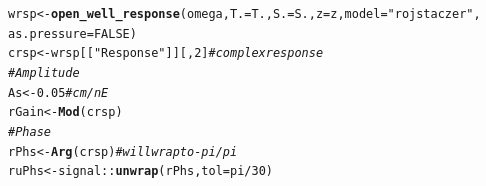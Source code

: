 \documentclass[10pt]{article}\usepackage[]{graphicx}\usepackage[]{color}
\makeatletter
\newcommand{\hlnum}[1]{\textcolor[rgb]{0.686,0.059,0.569}{#1}}%
\newcommand{\hlstr}[1]{\textcolor[rgb]{0.192,0.494,0.8}{#1}}%
\newcommand{\hlcom}[1]{\textcolor[rgb]{0.678,0.584,0.686}{\textit{#1}}}%
\newcommand{\hlopt}[1]{\textcolor[rgb]{0,0,0}{#1}}%
\newcommand{\hlstd}[1]{\textcolor[rgb]{0.345,0.345,0.345}{#1}}%
\newcommand{\hlkwb}[1]{\textcolor[rgb]{0.69,0.353,0.396}{#1}}%
\newcommand{\hlkwc}[1]{\textcolor[rgb]{0.333,0.667,0.333}{#1}}%
\newcommand{\hlkwd}[1]{\textcolor[rgb]{0.737,0.353,0.396}{\textbf{#1}}}%
\newenvironment{kframe}{%
 \def\at@end@of@kframe{}%
 \ifinner\ifhmode%
  \def\at@end@of@kframe{\end{minipage}}%
  \begin{minipage}{\columnwidth}%
 \fi\fi%
 \def\FrameCommand##1{\hskip\@totalleftmargin \hskip-\fboxsep
 \colorbox{shadecolor}{##1}\hskip-\fboxsep
     \hskip-\linewidth \hskip-\@totalleftmargin \hskip\columnwidth}%
 \MakeFramed {\advance\hsize-\width
   \@totalleftmargin\z@ \linewidth\hsize
   \@setminipage}}%
 {\par\unskip\endMakeFramed%
 \at@end@of@kframe}
\newenvironment{knitrout}{}{} %
\makeatother
\begin{document}
\begin{knitrout}
\color{fgcolor}\begin{kframe}
\begin{alltt}
\hlstd{wrsp} \hlkwb{<-} \hlkwd{open_well_response}\hlstd{(omega,} \hlkwc{T.} \hlstd{= T.,} \hlkwc{S.} \hlstd{= S.,} \hlkwc{z} \hlstd{= z,} \hlkwc{model} \hlstd{=} \hlstr{"rojstaczer"}\hlstd{,}
    \hlkwc{as.pressure} \hlstd{=} \hlnum{FALSE}\hlstd{)}
\hlstd{crsp} \hlkwb{<-} \hlstd{wrsp[[}\hlstr{"Response"}\hlstd{]][,} \hlnum{2}\hlstd{]}  \hlcom{# complex response}
\hlcom{# Amplitude}
\hlstd{As} \hlkwb{<-} \hlnum{0.05}  \hlcom{# cm/nE}
\hlstd{rGain} \hlkwb{<-} \hlkwd{Mod}\hlstd{(crsp)}
\hlcom{# Phase}
\hlstd{rPhs} \hlkwb{<-} \hlkwd{Arg}\hlstd{(crsp)}  \hlcom{# will wrap to -pi/pi}
\hlstd{ruPhs} \hlkwb{<-} \hlstd{signal::}\hlkwd{unwrap}\hlstd{(rPhs,} \hlkwc{tol} \hlstd{= pi}\hlopt{/}\hlnum{30}\hlstd{)}
\end{alltt}
\end{kframe}
\end{knitrout}
\end{document}
